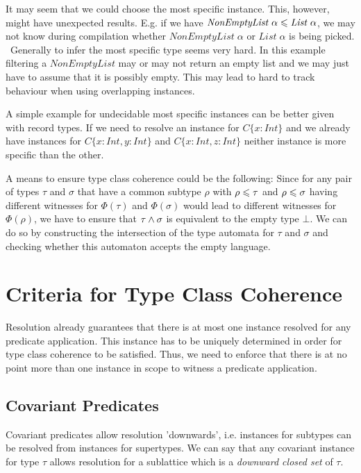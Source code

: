 It may seem that we could choose the most specific instance. This, however, might have unexpected results.
E.g. if we have $\mathit{NonEmptyList} \; \alpha \leqslant \mathit{List} \; \alpha$, we may not know during compilation whether $\mathit{NonEmptyList} \; \alpha $ or $\mathit{List} \; \alpha$ is being picked.
~Generally to infer the most specific type seems very hard. In this example filtering a $\mathit{NonEmptyList}$ may or may not return an empty list and we may just have to assume that it is possibly empty.
This may lead to hard to track behaviour when using overlapping instances.

A simple example for undecidable most specific instances can be better given with record types.
If we need to resolve an instance for $C \{x : Int\}$ and we already have instances for $C \{x : Int, y : Int\}$ and $C \{x : Int, z : Int\}$ neither instance is more specific than the other.


A means to ensure type class coherence could be the following:
Since for any pair of types $\tau$ and $\sigma$ that have a common subtype $\rho$ with $\rho \leqslant \tau$ and $\rho \leqslant \sigma$ having different witnesses for $\Phi(\tau)$ and $\Phi(\sigma)$ would lead to different witnesses for $\Phi(\rho)$,
we have to ensure that $\tau \wedge \sigma$ is equivalent to the empty type $\bot$.
We can do so by constructing the intersection of the type automata for $\tau$ and $\sigma$ and checking whether this automaton accepts the empty language.


\section{Criteria for Type Class Coherence}

Resolution already guarantees that there is at most one instance resolved for any predicate application.
This instance has to be uniquely determined in order for type class coherence to be satisfied.
Thus, we need to enforce that there is at no point more than one instance in scope to witness a predicate application.

\subsection{Covariant Predicates}

Covariant predicates allow resolution 'downwards', i.e. instances for subtypes can be resolved from instances for supertypes.
We can say that any covariant instance for type $\tau$ allows resolution for a sublattice which is a \emph{downward closed set} of $\tau$.

